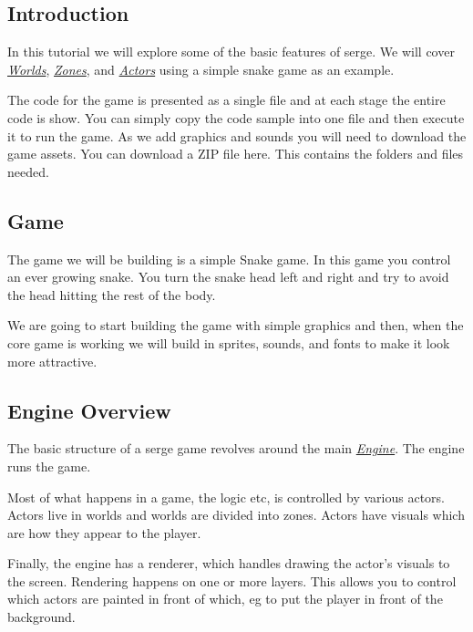 \documentclass[letterpaper,10pt,english]{sphinxmanual}
\begin{document}
\subsection{Introduction}
\label{tutorial-1:introduction}
In this tutorial we will explore some of the basic features of serge. We will
cover {\hyperref[world::doc]{\emph{Worlds}}}, {\hyperref[zone::doc]{\emph{Zones}}}, and {\hyperref[actor::doc]{\emph{Actors}}} using a simple snake game as
an example.

The code for the game is presented as a single file and at each stage the entire code is show. You can simply
copy the code sample into one file and then execute it to run the game. As we add graphics and sounds you will need
to download the game assets. You can download a ZIP file here. This contains the folders and files needed.


\subsection{Game}
\label{tutorial-1:game}
The game we will be building is a simple Snake game. In this game you control
an ever growing snake. You turn the snake head left and right and try to avoid
the head hitting the rest of the body.

We are going to start building the game with simple graphics and then, when
the core game is working we will build in sprites, sounds, and fonts to
make it look more attractive.


\subsection{Engine Overview}
\label{tutorial-1:engine-overview}
The basic structure of a serge game revolves around the main {\hyperref[engine::doc]{\emph{Engine}}}.
The engine runs the game.

Most of what happens in a game, the logic etc, is controlled by various actors.
Actors live in worlds and worlds are divided into zones. Actors have visuals which
are how they appear to the player.

Finally, the engine has a renderer, which handles drawing the actor's visuals to the screen.
Rendering happens on one or more layers. This allows you to control which actors are painted
in front of which, eg to put the player in front of the background.
\end{document}
